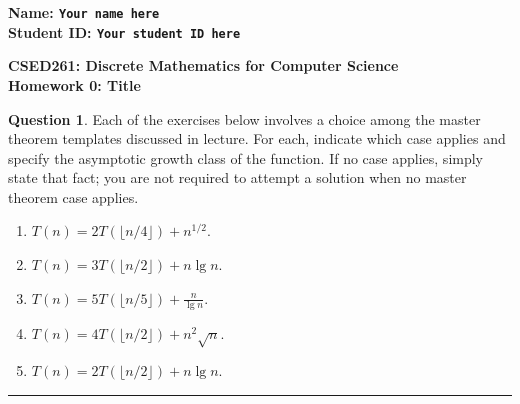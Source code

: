 \documentclass{article}%
\theoremstyle{definition}
\newtheorem{question}{Question}
\begin{document}
\begin{flushright}
\textbf{Name: \texttt{Your name here}\\
Student ID: \texttt{Your student ID here}}
\end{flushright}

\begin{center}
\textbf{CSED261: Discrete Mathematics for Computer Science \\
Homework 0: Title} \\
\end{center}

\begin{question}
Each of the exercises below involves a choice among the master theorem templates discussed in lecture.
For each, indicate which case applies and specify the asymptotic growth class of the function.  If no
case applies, simply state that fact; you are not required to attempt a solution when no master theorem case
applies.

\begin{enumerate}
\item $T(n) = 2 T(\lfloor n/4 \rfloor) + n^{1/2}$.
\item $T(n) = 3 T(\lfloor n/2 \rfloor) + n \lg n$.
\item $T(n) = 5 T(\lfloor n/5 \rfloor) + \frac{n}{\lg n}$.
\item $T(n) = 4 T(\lfloor n/2 \rfloor) + n^2 \sqrt{n}$.
\item $T(n) = 2 T(\lfloor n/2 \rfloor) + n \lg n$.
\end{enumerate}
\end{question}

\par\noindent\rule{\textwidth}{0.5pt}
\end{document}
